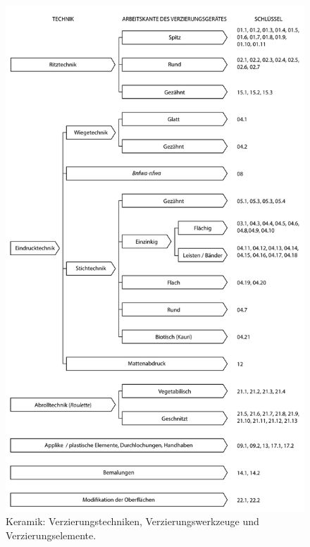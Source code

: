 \begin{multicols}{2}
\begin{figure}[p]
 \centering
 \includegraphics[width=.85\textwidth]{fig/VerzierungenSystematik.pdf}
 \caption{Keramik: Verzierungstechniken, Verzierungswerkzeuge und Verzierungselemente.}
 \label{fig:Keramik_VerzSystematik}
\end{figure}




\end{multicols}
